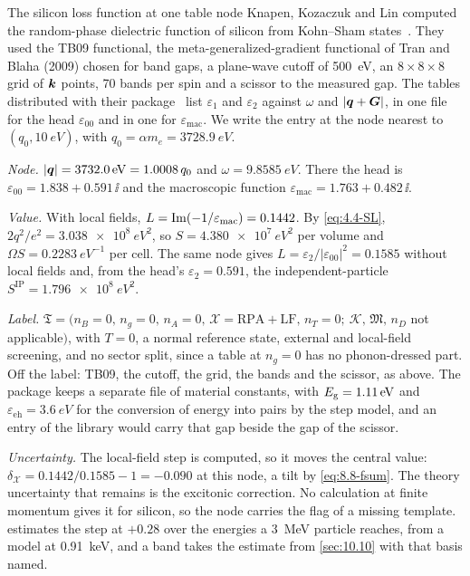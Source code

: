 \begin{workedexample}{The silicon loss function at one table node}\label{we:21-libentry}
Knapen, Kozaczuk and Lin computed the random-phase dielectric function of silicon from Kohn--Sham states~\cite[Sect.~III\,B]{knapen2021dark}. They used the TB09 functional, the meta-generalized-gradient functional of Tran and Blaha (2009) chosen for band gaps, a plane-wave cutoff of \SI{500}{eV}, an $8\times8\times8$ grid of $\bm{k}$ points, 70 bands per spin and a scissor to the measured gap. The tables distributed with their package~\cite{knapen2022darkelf} list $\varepsilon_1$ and $\varepsilon_2$ against $\omega$ and $|\bm{q} + \bm{G}|$, in one file for the head $\varepsilon_{00}$ and in one for $\varepsilon_{\mathrm{mac}}$. We write the entry at the node nearest to $(q_0,\SI{10}{eV})$, with $q_0 = \alpha m_e = \SI{3728.9}{eV}$.

\emph{Node.} $|\bm{q}| = \SI{3732.0}{eV} = 1.0008\,q_0$ and $\omega = \SI{9.8585}{eV}$. There the head is $\varepsilon_{00} = 1.838 + 0.591\,\ii$ and the macroscopic function $\varepsilon_{\mathrm{mac}} = 1.763 + 0.482\,\ii$.

\emph{Value.} With local fields, $L = \operatorname{Im}(-1/\varepsilon_{\mathrm{mac}}) = 0.1442$. By \cref{eq:4.4-SL}, $2q^2/e^2 = \SI{3.038e8}{eV^2}$, so $S = \SI{4.380e7}{eV^2}$ per volume and $\Omega S = \SI{0.2283}{eV^{-1}}$ per cell. The same node gives $L = \varepsilon_2/|\varepsilon_{00}|^2 = 0.1585$ without local fields and, from the head's $\varepsilon_2 = 0.591$, the independent-particle $S^{\mathrm{IP}} = \SI{1.796e8}{eV^2}$.

\emph{Label.} $\mathfrak{T} = (n_B = 0,\, n_g = 0,\, n_A = 0,\, \mathcal{X} = \mathrm{RPA + LF},\, n_T = 0;\ \mathcal{K},\, \mathfrak{M},\, n_D$ not applicable$)$, with $T = 0$, a normal reference state, external and local-field screening, and no sector split, since a table at $n_g = 0$ has no phonon-dressed part. Off the label: TB09, the cutoff, the grid, the bands and the scissor, as above. The package keeps a separate file of material constants, with $E_{\mathrm{g}} = \SI{1.11}{eV}$ and $\varepsilon_{\mathrm{eh}} = \SI{3.6}{eV}$ for the conversion of energy into pairs by the step model, and an entry of the library would carry that gap beside the gap of the scissor.

\emph{Uncertainty.} The local-field step is computed, so it moves the central value: $\delta_{\mathcal{X}} = 0.1442/0.1585 - 1 = -0.090$ at this node, a tilt by \cref{eq:8.8-fsum}. The theory uncertainty that remains is the excitonic correction. No calculation at finite momentum gives it for silicon, so the node carries the flag of a missing template.  estimates the step at $+0.28$ over the energies a \SI{3}{MeV} particle reaches, from a model at \SI{0.91}{keV}, and a band takes the estimate from \cref{sec:10.10} with that basis named.


\end{workedexample}
